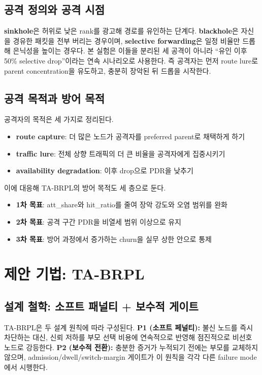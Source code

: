 \documentclass[10pt,a4paper,twocolumn]{article}
\begin{document}
\subsection{공격 정의와 공격 시점}

\textbf{sinkhole}은 허위로 낮은 rank를 광고해 경로를 유인하는 단계다.
\textbf{blackhole}은 자신을 경유한 패킷을 전부 버리는 경우이며,
\textbf{selective forwarding}은 일정 비율만 드롭해
은닉성을 높이는 경우다.
본 실험은 이들을 분리된 세 공격이 아니라
``유인 이후 50\% selective drop''이라는 연속 시나리오로 사용한다.
즉 공격자는 먼저 route lure로 parent concentration을 유도하고,
충분히 장악된 뒤 드롭을 시작한다.

\subsection{공격 목적과 방어 목적}

공격자의 목적은 세 가지로 정리된다.
\begin{itemize}
\item \textbf{route capture}: 더 많은 노드가 공격자를 preferred parent로 채택하게 하기
\item \textbf{traffic lure}: 전체 상향 트래픽의 더 큰 비율을 공격자에게 집중시키기
\item \textbf{availability degradation}: 이후 drop으로 PDR을 낮추기
\end{itemize}

이에 대응해 TA-BRPL의 방어 목적도 세 층으로 둔다.
\begin{itemize}
\item \textbf{1차 목표}: att\_share와 hit\_ratio를 줄여 장악 강도와 오염 범위를 완화
\item \textbf{2차 목표}: 공격 구간 PDR을 비열세 범위 이상으로 유지
\item \textbf{3차 목표}: 방어 과정에서 증가하는 churn을 실무 상한 안으로 통제
\end{itemize}


\section{제안 기법: TA-BRPL}
\label{sec:design}

\subsection{설계 철학: 소프트 패널티 + 보수적 게이트}

TA-BRPL은 두 설계 원칙에 따라 구성된다.
\textbf{P1 (소프트 페널티):} 불신 노드를 즉시 차단하는 대신,
신뢰 저하를 부모 선택 비용에 연속적으로 반영해 점진적으로 비선호 노드로 강등한다.
\textbf{P2 (보수적 전환):} 충분한 증거가 누적되기 전에는 부모를 교체하지 않으며,
admission/dwell/switch-margin 게이트가 이 원칙을 각각 다른 failure mode에서 시행한다.
\end{document}
